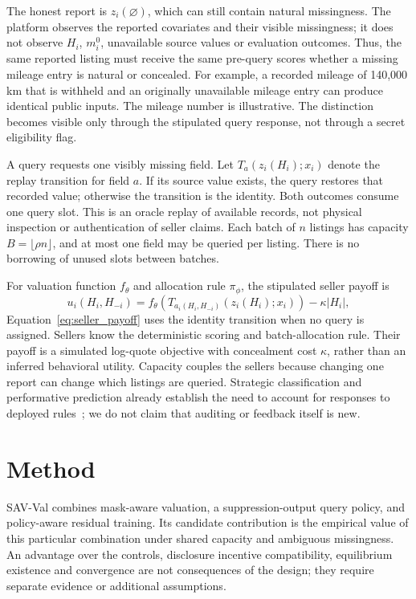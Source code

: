 \documentclass[10pt,journal]{IEEEtran}
\begin{document}
The honest report is $z_i(\varnothing)$, which can still contain natural
missingness. The platform observes the reported covariates and their visible
missingness; it does not observe $H_i$, $m_i^0$, unavailable source values or
evaluation outcomes. Thus, the same reported listing must receive the same
pre-query scores whether a missing mileage entry is natural or concealed.
For example, a recorded mileage of 140,000 km that is withheld and an
originally unavailable mileage entry can produce identical public inputs.
The mileage number is illustrative. The distinction becomes visible only
through the stipulated query response, not through a secret eligibility flag.

A query requests one visibly missing field. Let $T_a(z_i(H_i);x_i)$ denote
the replay transition for field $a$. If its source value exists, the query
restores that recorded value; otherwise the transition is the identity.
Both outcomes consume one query slot. This is an oracle replay of available
records, not physical inspection or authentication of seller claims.
Each batch of $n$ listings has capacity $B=\lfloor\rho n\rfloor$, and at most
one field may be queried per listing. There is no borrowing of unused slots
between batches.

For valuation function $f_\theta$ and allocation rule $\pi_\phi$, the
stipulated seller payoff is
\begin{equation}
u_i(H_i,H_{-i})=
f_\theta\!\left(T_{a_i(H_i,H_{-i})}(z_i(H_i);x_i)\right)
-\kappa|H_i|,
\label{eq:seller_payoff}
\end{equation}
Equation~\eqref{eq:seller_payoff} uses the identity transition when no query
is assigned. Sellers know the
deterministic scoring and batch-allocation rule. Their payoff is a simulated
log-quote objective with concealment cost $\kappa$, rather than an inferred
behavioral utility. Capacity couples the sellers because changing one report
can change which listings are queried. Strategic classification and
performative prediction already establish the need to account for responses
to deployed rules~\cite{hardt2016strategic,perdomo2020performative}; we do not
claim that auditing or feedback itself is new.

\section{Method}
SAV-Val combines mask-aware valuation, a suppression-output query policy,
and policy-aware residual training. Its candidate contribution is the
empirical value of this particular combination under shared capacity and
ambiguous missingness. An advantage over the controls, disclosure incentive compatibility,
equilibrium existence and convergence are not consequences of the design;
they require separate evidence or additional assumptions.
\end{document}
